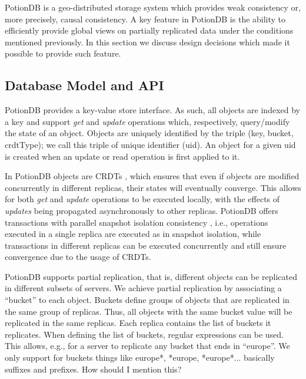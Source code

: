 \documentclass{vldb}
\newcommand{\grumbler}[2]{{\color{red}{\bf #1:} #2}}
\newcommand{\andre}[1]{\grumbler{andre}{#1}}
\begin{document}
PotionDB is a geo-distributed storage system which provides weak consistency or, more precisely, causal consistency.
A key feature in PotionDB is the ability to efficiently provide global views on partially replicated data under the conditions mentioned previously.
In this section we discuss design decisions which made it possible to provide such feature.

\subsection{Database Model and API}
\label{subsec:databasemodel}

%
%
%
%
%

PotionDB provides a key-value store interface.
As such, all objects are indexed by a key and support \emph{get} and \emph{update} operations which, respectively, query/modify the state of an object.
Objects are uniquely identified by the triple (key, bucket, crdtType); we call this triple of unique identifier (uid).
An object for a given uid is created when an update or read operation is first applied to it.

In PotionDB objects are CRDTs \cite{crdt}, which ensures that even if objects are modified concurrently in different replicas, their states will eventually converge.
This allows for both \emph{get} and \emph{update} operations to be executed locally, with the effects of \emph{updates} being propagated asynchronously to other replicas.
PotionDB offers transactions with parallel snapshot isolation consistency \cite{parallelSI}, i.e., operations executed in a single replica are executed as in snapshot isolation, while transactions in different replicas can be executed concurrently and still ensure convergence due to the usage of CRDTs.

PotionDB supports partial replication, that is, different objects can be replicated in different subsets of servers.
We achieve partial replication by associating a ``bucket'' to each object. Buckets define groups of objects that are replicated in the same group of replicas.
Thus, all objects with the same bucket value will be replicated in the same replicas.
Each replica contains the list of buckets it replicates.
When defining the list of buckets, regular expressions can be used.
This allows, e.g., for a server to replicate any bucket that ends in ``europe''.
\andre{We only support for buckets things like europe*, *europe, *europe*... basically suffixes and prefixes. How should I mention this?}
\end{document}
